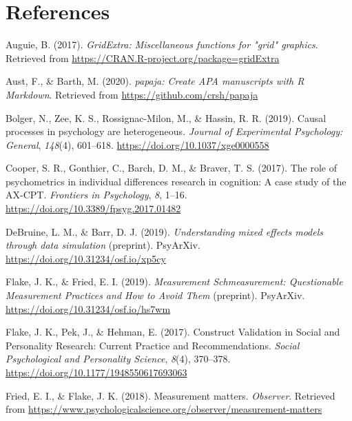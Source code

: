 \documentclass[english,man,floatsintext]{apa6}
\begin{document}
\newpage

\hypertarget{references}{%
\section{References}\label{references}}

\begingroup
\setlength{\parindent}{-0.5in}
\setlength{\leftskip}{0.5in}

\hypertarget{refs}{}
\leavevmode\hypertarget{ref-R-gridExtra}{}%
Auguie, B. (2017). \emph{GridExtra: Miscellaneous functions for "grid" graphics}. Retrieved from \url{https://CRAN.R-project.org/package=gridExtra}

\leavevmode\hypertarget{ref-R-papaja}{}%
Aust, F., \& Barth, M. (2020). \emph{papaja: Create APA manuscripts with R Markdown}. Retrieved from \url{https://github.com/crsh/papaja}

\leavevmode\hypertarget{ref-bolger_causal_2019}{}%
Bolger, N., Zee, K. S., Rossignac-Milon, M., \& Hassin, R. R. (2019). Causal processes in psychology are heterogeneous. \emph{Journal of Experimental Psychology: General}, \emph{148}(4), 601--618. \url{https://doi.org/10.1037/xge0000558}

\leavevmode\hypertarget{ref-cooper_role_2017}{}%
Cooper, S. R., Gonthier, C., Barch, D. M., \& Braver, T. S. (2017). The role of psychometrics in individual differences research in cognition: A case study of the AX-CPT. \emph{Frontiers in Psychology}, \emph{8}, 1--16. \url{https://doi.org/10.3389/fpsyg.2017.01482}

\leavevmode\hypertarget{ref-debruine_understanding_2019}{}%
DeBruine, L. M., \& Barr, D. J. (2019). \emph{Understanding mixed effects models through data simulation} (preprint). PsyArXiv. \url{https://doi.org/10.31234/osf.io/xp5cy}

\leavevmode\hypertarget{ref-flake_measurement_2019}{}%
Flake, J. K., \& Fried, E. I. (2019). \emph{Measurement Schmeasurement: Questionable Measurement Practices and How to Avoid Them} (preprint). PsyArXiv. \url{https://doi.org/10.31234/osf.io/hs7wm}

\leavevmode\hypertarget{ref-flake_construct_2017}{}%
Flake, J. K., Pek, J., \& Hehman, E. (2017). Construct Validation in Social and Personality Research: Current Practice and Recommendations. \emph{Social Psychological and Personality Science}, \emph{8}(4), 370--378. \url{https://doi.org/10.1177/1948550617693063}

\leavevmode\hypertarget{ref-fried_measurement_2018}{}%
Fried, E. I., \& Flake, J. K. (2018). Measurement matters. \emph{Observer}. Retrieved from \url{https://www.psychologicalscience.org/observer/measurement-matters}
\end{document}
